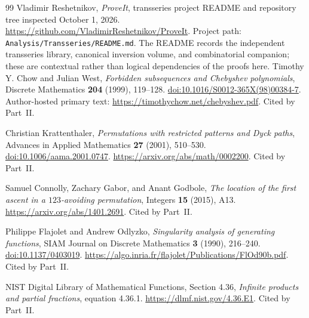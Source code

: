 \documentclass[11pt]{article}
\numberwithin{equation}{section}
\theoremstyle{definition}
\begin{document}
\begin{thebibliography}{99}
Vladimir Reshetnikov, \emph{ProveIt}, transseries project README and
repository tree inspected October 1, 2026.
\url{https://github.com/VladimirReshetnikov/ProveIt}.
Project path: \texttt{Analysis/Transseries/README.md}.
The README records the independent transseries library, canonical inversion
volume, and combinatorial companion; these are contextual rather than
logical dependencies of the proofs here.
Timothy Y. Chow and Julian West, \emph{Forbidden subsequences and
Chebyshev polynomials}, Discrete Mathematics \textbf{204} (1999),
119--128. \href{https://doi.org/10.1016/S0012-365X(98)00384-7}
{doi:10.1016/S0012-365X(98)00384-7}.
Author-hosted primary text: \url{https://timothychow.net/chebyshev.pdf}.
Cited by Part~II.

Christian Krattenthaler, \emph{Permutations with restricted patterns
and Dyck paths}, Advances in Applied Mathematics \textbf{27} (2001),
510--530. \href{https://doi.org/10.1006/aama.2001.0747}
{doi:10.1006/aama.2001.0747}.
\url{https://arxiv.org/abs/math/0002200}. Cited by Part~II.

Samuel Connolly, Zachary Gabor, and Anant Godbole,
\emph{The location of the first ascent in a $123$-avoiding
permutation}, Integers \textbf{15} (2015), A13.
\url{https://arxiv.org/abs/1401.2691}. Cited by Part~II.

Philippe Flajolet and Andrew Odlyzko, \emph{Singularity analysis of
generating functions}, SIAM Journal on Discrete Mathematics
\textbf{3} (1990), 216--240.
\href{https://doi.org/10.1137/0403019}{doi:10.1137/0403019}.
\url{https://algo.inria.fr/flajolet/Publications/FlOd90b.pdf}.
Cited by Part~II.

NIST Digital Library of Mathematical Functions, Section 4.36,
\emph{Infinite products and partial fractions}, equation 4.36.1.
\url{https://dlmf.nist.gov/4.36.E1}. Cited by Part~II.
\end{thebibliography}
\end{document}

